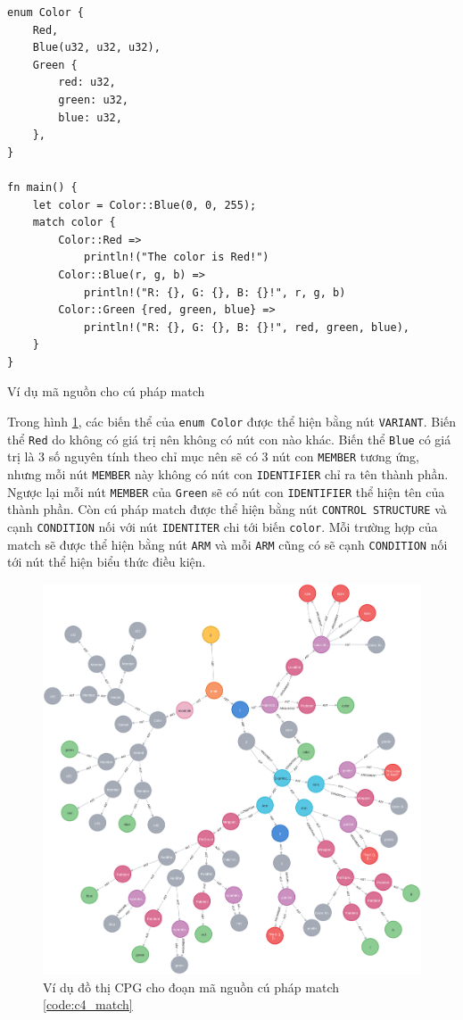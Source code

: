 \begin{listing}[H]
\begin{verbatim}
enum Color {
    Red,
    Blue(u32, u32, u32),
    Green {
        red: u32,
        green: u32,
        blue: u32,
    },
}

fn main() {
    let color = Color::Blue(0, 0, 255);
    match color {
        Color::Red =>
            println!("The color is Red!")
        Color::Blue(r, g, b) =>
            println!("R: {}, G: {}, B: {}!", r, g, b)
        Color::Green {red, green, blue} =>
            println!("R: {}, G: {}, B: {}!", red, green, blue),
    }
}
\end{verbatim}
\caption{Ví dụ mã nguồn cho cú pháp match}
\label{code:c4_match}
\end{listing}

Trong hình \ref{img:c4_match}, các biến thể của \texttt{enum Color} được thể hiện bằng nút \texttt{VARIANT}.
Biến thể \texttt{Red} do không có giá trị nên không có nút con nào khác.
Biến thể \texttt{Blue} có giá trị là 3 số nguyên tính theo chỉ mục nên sẽ có 3 nút con \texttt{MEMBER} tương ứng, nhưng mỗi nút \texttt{MEMBER} này không có nút con \texttt{IDENTIFIER} chỉ ra tên thành phần.
Ngược lại mỗi nút \texttt{MEMBER} của \texttt{Green} sẽ có nút con \texttt{IDENTIFIER} thể hiện tên của thành phần.
Còn cú pháp match được thể hiện bằng nút \texttt{CONTROL STRUCTURE} và cạnh \texttt{CONDITION} nối với nút \texttt{IDENTITER} chi tới biến \texttt{color}.
Mỗi trường hợp của match sẽ được thể hiện bằng nút \texttt{ARM} và mỗi \texttt{ARM} cũng có sẽ cạnh \texttt{CONDITION} nối tới nút thể hiện biểu thức điều kiện.

\begin{figure}[H]
    \includegraphics[width=1\columnwidth]{figures/c4/c4_match.png}
    \centering
    \caption{Ví dụ đồ thị CPG cho đoạn mã nguồn cú pháp match \ref{code:c4_match}}
    \label{img:c4_match}
\end{figure}

